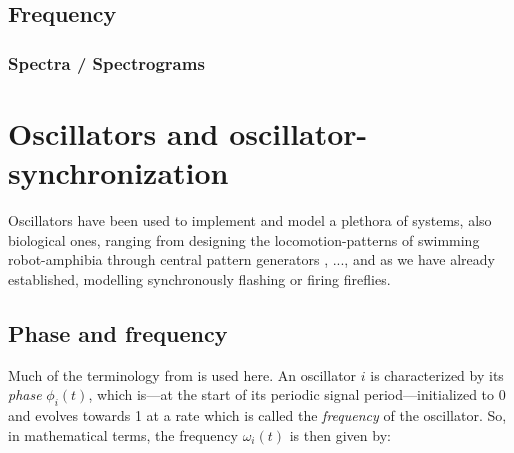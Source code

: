 	\subsection{Frequency}
		\subsubsection{Spectra / Spectrograms}




\section{Oscillators and oscillator-synchronization}





	 \nl



Oscillators have been used to implement and model a plethora of systems, also biological ones, ranging from designing the locomotion-patterns of swimming robot-amphibia through central pattern generators \cite{ijspeert_cpg}, ..., and as we have already established, modelling synchronously flashing or firing fireflies.
	
	
	\subsection{Phase and frequency}
	Much of the terminology from \cite{nymoen_synch} is used here. An oscillator $i$ is characterized by its \textit{phase} $\phi_i(t)$, which is—at the start of its periodic signal period—initialized to 0 and evolves towards 1 at a rate which is called the \textit{frequency} of the oscillator. So, in mathematical terms, the frequency $\omega_i(t)$ is then given by:
	
